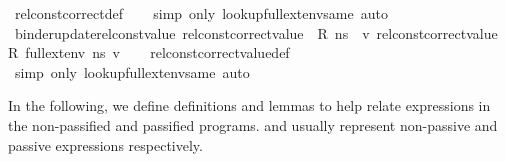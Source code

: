 \begin{isabellebody}
\endisadelimproof
%
\isatagproof
{}\isamarkupfalse%
\ rel{\isacharunderscore}{\kern0pt}const{\isacharunderscore}{\kern0pt}correct{\isacharunderscore}{\kern0pt}def\isanewline
\ \ \isamarkupfalse%
\ {\isacharparenleft}{\kern0pt}simp\ only{\isacharcolon}{\kern0pt}\ lookup{\isacharunderscore}{\kern0pt}full{\isacharunderscore}{\kern0pt}ext{\isacharunderscore}{\kern0pt}env{\isacharunderscore}{\kern0pt}same{\isacharparenright}{\kern0pt}\ auto%
\endisatagproof
{\isafoldproof}%
%
\isadelimproof
\ \ \isanewline
%
\endisadelimproof
\isanewline
{}\isamarkupfalse%
\ binder{\isacharunderscore}{\kern0pt}update{\isacharunderscore}{\kern0pt}rel{\isacharunderscore}{\kern0pt}const{\isacharunderscore}{\kern0pt}value{\isacharcolon}{\kern0pt}\ {\isachardoublequoteopen}rel{\isacharunderscore}{\kern0pt}const{\isacharunderscore}{\kern0pt}correct{\isacharunderscore}{\kern0pt}value\ {\isasymLambda}\ R\ ns\ {\isasymLongrightarrow}\ {\isacharparenleft}{\kern0pt}{\isasymAnd}v{\isachardot}{\kern0pt}\ rel{\isacharunderscore}{\kern0pt}const{\isacharunderscore}{\kern0pt}correct{\isacharunderscore}{\kern0pt}value\ {\isasymLambda}\ R\ {\isacharparenleft}{\kern0pt}full{\isacharunderscore}{\kern0pt}ext{\isacharunderscore}{\kern0pt}env\ ns\ v{\isacharparenright}{\kern0pt}{\isacharparenright}{\kern0pt}{\isachardoublequoteclose}\isanewline
%
\isadelimproof
\ \ %
\endisadelimproof
%
\isatagproof
{}\isamarkupfalse%
\ rel{\isacharunderscore}{\kern0pt}const{\isacharunderscore}{\kern0pt}correct{\isacharunderscore}{\kern0pt}value{\isacharunderscore}{\kern0pt}def\isanewline
\ \ \isamarkupfalse%
\ {\isacharparenleft}{\kern0pt}simp\ only{\isacharcolon}{\kern0pt}\ lookup{\isacharunderscore}{\kern0pt}full{\isacharunderscore}{\kern0pt}ext{\isacharunderscore}{\kern0pt}env{\isacharunderscore}{\kern0pt}same{\isacharparenright}{\kern0pt}\ auto%
\endisatagproof
{\isafoldproof}%
%
\isadelimproof
%
\endisadelimproof
%
\isadelimdocument
%
\endisadelimdocument
%
\isatagdocument
%
\isamarkuptrue%
%
\endisatagdocument
{\isafolddocument}%
%
\isadelimdocument
%
\endisadelimdocument
%
\begin{isamarkuptext}%
In the following, we define definitions and lemmas to help relate expressions in the non-passified
and passified programs.  and  usually represent non-passive and passive expressions
respectively.%
\end{isamarkuptext}\isamarkuptrue%
\isamarkupfalse%

\end{isabellebody}
